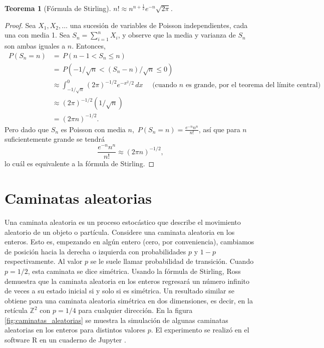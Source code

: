 \documentclass[12pt,letterpaper]{article}
\newcommand\pr[1]{\, P \left( #1 \right)}
\newtheorem{teo}{Teorema}
\begin{document}
\begin{teo}[Fórmula de Stirling]
	$n! \approx n^{n + \frac{1}{2}} e^{-n} \sqrt{2 \pi}$.
\end{teo}
\begin{proof}
	Sea $X_1, X_2, \dots$ una sucesión de variables de Poisson independientes, cada una con media 1. Sea $S_n = \sum_{i = 1}^{n} X_i$, y observe que la media y varianza de $S_n$ son ambas iguales a $n$. Entonces, 
	\begin{align}
	\pr{S_n = n} &= \pr{n-1 < S_n \leq n}\\
	&= \pr{-1/\sqrt{n} < (S_n -n)/\sqrt{n} \leq 0}\\
	&\approx \int_{-1/\sqrt{n}}^{0} (2\pi)^{-1/2} e^{-x^2 / 2} \, dx \quad \text{ (cuando } n \text{ es grande, por el teorema del límite central)} \\
	&\approx (2\pi)^{-1/2} (1/\sqrt{n})\\
	&= (2\pi n)^{-1/2}.
	\end{align}
	Pero dado que $S_n$ es Poisson con media $n$, $\pr{S_n = n} = \frac{e^{-n} n^n}{n!}$, así que para $n$ suficientemente grande se tendrá
	\begin{equation}
		\frac{e^{-n} n^n}{n!} \approx (2\pi n)^{-1/2},
	\end{equation} lo cuál es equivalente a la fórmula de Stirling.
\end{proof}

\section{Caminatas aleatorias}

Una caminata aleatoria es un proceso estocástico que describe el movimiento aleatorio de un objeto o partícula. Considere una caminata aleatoria en los enteros. Esto es, empezando en algún entero (cero, por conveniencia), cambiamos de posición hacia la derecha o izquierda con probabilidades $p$ y $1-p$ respectivamente. Al valor $p$ se le suele llamar probabilidad de transición. Cuando $p = 1/2$, esta caminata se dice simétrica. Usando la fórmula de Stirling, Ross \cite{Ross_2000} demuestra que la caminata aleatoria en los enteros regresará un número infinito de veces a su estado inicial si y solo si es simétrica. Un resultado similar se obtiene para una caminata aleatoria simétrica en dos dimensiones, es decir, en la retícula $\mathbb{Z}^2$ con $p = 1/4$ para cualquier dirección. En la figura \ref{fig:caminatas_aleatorias} se muestra la simulación de algunas caminatas aleatorias en los enteros para distintos valores $p$. El experimento se realizó en el software R \cite{R} en un cuaderno de Jupyter \cite{jupyter}.
\end{document}
